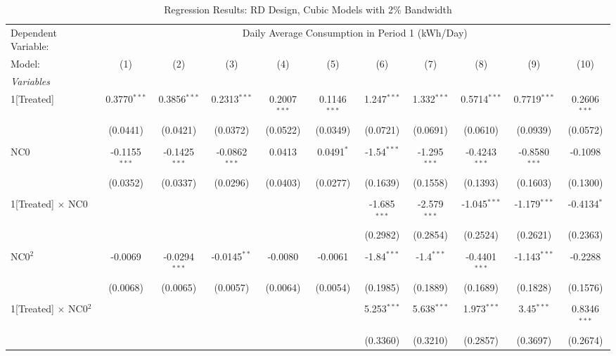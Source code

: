 \begin{table}[htbp]
\centering
\caption{\label{Table:Regression-Results_RD_Cubic_BW-2} Regression Results: RD Design, Cubic Models with 2\% Bandwidth}
\begin{adjustbox}{scale = 0.7}
\begin{tabular}{lcccccccccc}
\tabularnewline\toprule\toprule
Dependent Variable:&\multicolumn{10}{c}{Daily Average Consumption in Period 1 (kWh/Day)}\\
Model:&(1) & (2) & (3) & (4) & (5) & (6) & (7) & (8) & (9) & (10)\\
\midrule
\emph{Variables}&   &   &   &   &   &   &   &   &   &  \\
1[Treated]&0.3770$^{***}$ & 0.3856$^{***}$ & 0.2313$^{***}$ & 0.2007$^{***}$ & 0.1146$^{***}$ & 1.247$^{***}$ & 1.332$^{***}$ & 0.5714$^{***}$ & 0.7719$^{***}$ & 0.2606$^{***}$\\
  &(0.0441) & (0.0421) & (0.0372) & (0.0522) & (0.0349) & (0.0721) & (0.0691) & (0.0610) & (0.0939) & (0.0572)\\
&   &   &   &   &   &   &   &   &   &  \\
NC0&-0.1155$^{***}$ & -0.1425$^{***}$ & -0.0862$^{***}$ & 0.0413 & 0.0491$^{*}$ & -1.54$^{***}$ & -1.295$^{***}$ & -0.4243$^{***}$ & -0.8580$^{***}$ & -0.1098\\
  &(0.0352) & (0.0337) & (0.0296) & (0.0403) & (0.0277) & (0.1639) & (0.1558) & (0.1393) & (0.1603) & (0.1300)\\
&   &   &   &   &   &   &   &   &   &  \\
1[Treated] $\times $ NC0&   &    &    &    &    & -1.685$^{***}$ & -2.579$^{***}$ & -1.045$^{***}$ & -1.179$^{***}$ & -0.4134$^{*}$\\
  &   &    &    &    &    & (0.2982) & (0.2854) & (0.2524) & (0.2621) & (0.2363)\\
&   &   &   &   &   &   &   &   &   &  \\
NC0$^2$&-0.0069 & -0.0294$^{***}$ & -0.0145$^{**}$ & -0.0080 & -0.0061 & -1.84$^{***}$ & -1.4$^{***}$ & -0.4401$^{***}$ & -1.143$^{***}$ & -0.2288\\
  &(0.0068) & (0.0065) & (0.0057) & (0.0064) & (0.0054) & (0.1985) & (0.1889) & (0.1689) & (0.1828) & (0.1576)\\
&   &   &   &   &   &   &   &   &   &  \\
1[Treated] $\times $ NC0$^2$&   &    &    &    &    & 5.253$^{***}$ & 5.638$^{***}$ & 1.973$^{***}$ & 3.45$^{***}$ & 0.8346$^{***}$\\
  &   &    &    &    &    & (0.3360) & (0.3210) & (0.2857) & (0.3697) & (0.2674)\\

\end{tabular}
\end{adjustbox}
\end{table}
